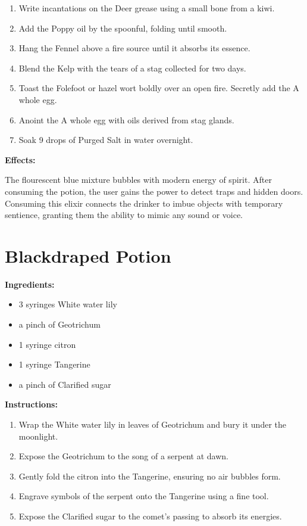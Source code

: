 \documentclass{article}
\begin{document}
\begin{enumerate}
  \item Write incantations on the Deer grease using a small bone from a kiwi.
  \item Add the Poppy oil by the spoonful, folding until smooth.
  \item Hang the Fennel above a fire source until it absorbs its essence.
  \item Blend the Kelp with the tears of a stag collected for two days.
  \item Toast the Folefoot or hazel wort boldly over an open fire. Secretly add the A whole egg.
  \item Anoint the A whole egg with oils derived from stag glands.
  \item Soak 9 drops of Purged Salt in water overnight.
\end{enumerate}

\textbf{Effects:}

The flourescent blue mixture bubbles with modern energy of spirit. After consuming the potion, the user gains the power to detect traps and hidden doors. Consuming this elixir connects the drinker to imbue objects with temporary sentience, granting them the ability to mimic any sound or voice.

\newpage
\section*{Blackdraped Potion}

\textbf{Ingredients:}

\begin{itemize}
  \item 3 syringes White water lily
  \item a pinch of Geotrichum
  \item 1 syringe citron
  \item 1 syringe Tangerine
  \item a pinch of Clarified sugar
\end{itemize}

\textbf{Instructions:}

\begin{enumerate}
  \item Wrap the White water lily in leaves of Geotrichum and bury it under the moonlight.
  \item Expose the Geotrichum to the song of a serpent at dawn.
  \item Gently fold the citron into the Tangerine, ensuring no air bubbles form.
  \item Engrave symbols of the serpent onto the Tangerine using a fine tool.
  \item Expose the Clarified sugar to the comet’s passing to absorb its energies.
\end{enumerate}
\end{document}
